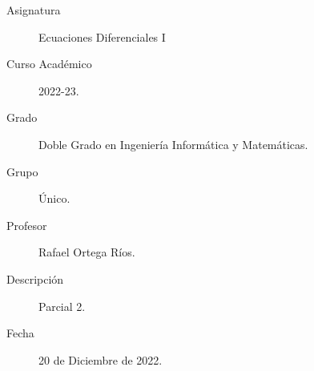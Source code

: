 \documentclass[12pt]{article}
\begin{document}

    
    

    \begin{description}
        \item[Asignatura] Ecuaciones Diferenciales I
        \item[Curso Académico] 2022-23.
        \item[Grado] Doble Grado en Ingeniería Informática y Matemáticas.
        \item[Grupo] Único.
        \item[Profesor] Rafael Ortega Ríos.
        \item[Descripción] Parcial 2.
        \item[Fecha] 20 de Diciembre de 2022.
    \end{description}
    \newpage
\end{document}
